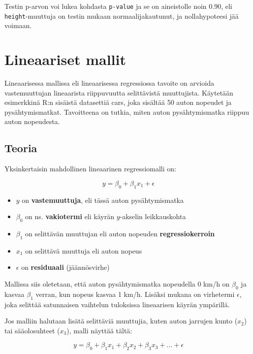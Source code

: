 \documentclass[
]{book}
\providecommand{\tightlist}{%
  \setlength{\itemsep}{0pt}\setlength{\parskip}{0pt}}
\begin{document}
Testin p-arvon voi lukea kohdasta \texttt{p-value} ja se on aineistolle noin \(0.90\), eli \texttt{height}-muuttuja on testin mukaan normaalijakautunut, ja nollahypoteesi jää voimaan.

\hypertarget{linear_models}{%
\chapter{Lineaariset mallit}\label{linear_models}}

Lineaarisessa mallissa eli lineaarisessa regressiossa tavoite on arvioida vastemuuttujan lineaarista riippuvuutta selittävistä muuttujista. Käytetään esimerkkinä R:n sisäistä datasettiä cars, joka sisältää 50 auton nopeudet ja pysähtymismatkat. Tavoitteena on tutkia, miten auton pysähtymismatka riippuu auton nopeudesta.

\hypertarget{teoria}{%
\section{Teoria}\label{teoria}}

Yksinkertaisin mahdollinen lineaarinen regressiomalli on:

\[ y = \beta_0 + \beta_1 x_1 + \epsilon \]

\begin{itemize}
\tightlist
\item
  \(y\) on \textbf{vastemuuttuja}, eli tässä auton pysähtymismatka
\item
  \(\beta_0\) on ns. \textbf{vakiotermi} eli käyrän \(y\)-akselin leikkauskohta
\item
  \(\beta_1\) on selittävän muuttujan eli auton nopeuden \textbf{regressiokerroin}
\item
  \(x_1\) on selittävä muuttuja eli auton nopeus
\item
  \(\epsilon\) on \textbf{residuaali} (jäännösvirhe)
\end{itemize}

Mallissa siis oletetaan, että auton pysähtymismatka nopeudella 0 km/h on \(\beta_0\) ja kasvaa \(\beta_1\) verran, kun nopeus kasvaa 1 km/h. Lisäksi mukana on virhetermi \(\epsilon\), joka selittää satunnaisen vaihtelun tuloksissa lineaarisen käyrän ympärillä.

Jos malliin halutaan lisätä selittäviä muuttujia, kuten auton jarrujen kunto (\(x_2\)) tai sääolosuhteet (\(x_3\)), malli näyttää tältä:

\[ y = \beta_0 + \beta_1 x_1 + \beta_2 x_2 + \beta_3 x_3 + ... + \epsilon \]
\end{document}
